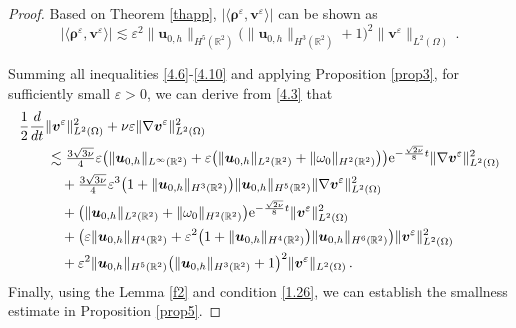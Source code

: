 \documentclass[pdflatex,sn-mathphys-num]{sn-jnl}%
\theoremstyle{thmstyleone}%
\theoremstyle{thmstyletwo}%
\theoremstyle{thmstylethree}%
\theoremstyle{thmstyletwo}
\begin{document}
\begin{proof}
	Based on Theorem \ref{thapp}, $|\langle
	\boldsymbol \rho^{\varepsilon}	,{\boldsymbol v}^{\varepsilon}\rangle|$ can be shown as
	\begin{equation}\label{4.10}
		|\langle
		\boldsymbol \rho^{\varepsilon}	,{\boldsymbol v}^{\varepsilon}\rangle|
		\lesssim
		\varepsilon^2
		\lVert
		{\boldsymbol{u}}_{0,h}
		\rVert_{{H}^{5}(\mathbb{R}^2)}
		\big(
		\lVert
		{\boldsymbol{u}}_{0,h}
		\rVert_{{H}^{3}(\mathbb{R}^2)}
		+1\big)^2\lVert{\boldsymbol v}^{\varepsilon}\rVert_{{L}^2(\Omega)}
		\,.
	\end{equation}	

	

	
	
	
	Summing all inequalities \eqref{4.6}-\eqref{4.10} and applying Proposition \ref{prop3}, for sufficiently small $\varepsilon > 0$, we can derive from \eqref{4.3} that
	\begin{align}
		\label{4.15}
		&\frac{1}{2}\frac{d}{dt}\lVert\boldsymbol v^{\varepsilon}\rVert^2_{{L}^2(\Omega)}
		+\nu\varepsilon
		\lVert\nabla\boldsymbol v^{\varepsilon}\rVert^2_{{L}^2(\Omega)}\notag\\
		&\qquad\lesssim
		\tfrac{3\sqrt{3\nu}}{4}
		\varepsilon
		\big(
		\lVert{\boldsymbol{u}}_{0,h}\rVert_{L^\infty(\mathbb{R}^2)} 
		+\varepsilon\big(
		\lVert{\boldsymbol{u}}_{0,h}\rVert_{L^2(\mathbb{R}^2)}+\lVert{\omega}_0\rVert_{H^2(\mathbb{R}^2)}
		\big)
		\big)\mathrm{e}^{-\frac{\sqrt{2\nu}}{8}  t}
		\lVert\nabla{\boldsymbol v}^{\varepsilon}\rVert^2_{{L}^2(\Omega)}
		\notag\\
		&\qquad\quad+\tfrac{3\sqrt{3\nu}}{4}\varepsilon^3
		\big(
		1+
		\lVert {\boldsymbol{u}}_{0,h} \rVert_{H^{3}(\mathbb{R}^2)}
		\big)
		\lVert {\boldsymbol{u}}_{0,h} \rVert_{H^{5}(\mathbb{R}^2)}
		\lVert\nabla{\boldsymbol v}^{\varepsilon}\rVert^2_{{L}^2(\Omega)}\notag\\
		&\qquad\quad+
		\big(
		\lVert{\boldsymbol{u}}_{0,h}\rVert_{L^2(\mathbb{R}^2)}+\lVert{\omega}_0\rVert_{H^2(\mathbb{R}^2)}
		\big)\mathrm{e}^{-\frac{\sqrt{2\nu}}{8}  t}\lVert {\boldsymbol v}^{\varepsilon} \rVert^2_{{L}^2(\Omega)}
		\notag\\
		&\qquad\quad+\big(\varepsilon
		\lVert {\boldsymbol{u}}_{0,h} \rVert_{H^{4}(\mathbb{R}^2)}
		+\varepsilon^2
		\big(
		1+
		\lVert {\boldsymbol{u}}_{0,h} \rVert_{H^{4}(\mathbb{R}^2)}
		\big)
		\lVert {\boldsymbol{u}}_{0,h} \rVert_{H^{6}(\mathbb{R}^2)}\big)\lVert {\boldsymbol v}^{\varepsilon} \rVert^2_{{L}^2(\Omega)}\notag\\
		&\qquad\quad+\varepsilon^2
		\lVert
		{\boldsymbol{u}}_{0,h}
		\rVert_{{H}^{5}(\mathbb{R}^2)}
		\big(
		\lVert
		{\boldsymbol{u}}_{0,h}
		\rVert_{{H}^{3}(\mathbb{R}^2)}
		+1\big)^2\lVert{\boldsymbol v}^{\varepsilon}\rVert_{{L}^2(\Omega)}\,.
	\end{align}
Finally, using the Lemma \ref{f2} and condition \eqref{1.26}, we can establish the smallness estimate in Proposition \ref{prop5}.
\end{proof}
\end{document}
